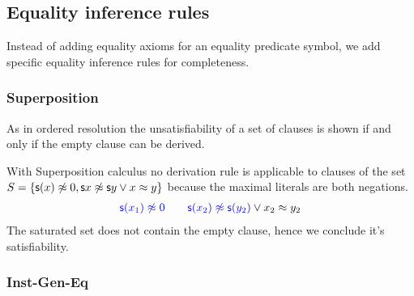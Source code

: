 
\subsection{Equality inference rules}

Instead of adding equality axioms for an equality predicate symbol,
we add specific equality inference rules for completeness.


\subsubsection{Superposition}\label{sec:superposition}

As in ordered resolution the unsatisfiability of a set of clauses is shown
if and only if the empty clause can be derived. 




\begin{example} With Superposition calculus no derivation rule is applicable
	to clauses of the set \( S = \{ \mathsf{s}(x)\not\approx 0, \mathsf{s}{x}\not\approx\mathsf{s}{y} \lor x\approx y \} \)
	because the maximal literals are both negations.
	\begin{align*}
	{\colN \msucc(x_1) \mNE 0}\qquad{\colN \msucc(x_2) \mNE \msucc(y_2)} \lor x_2\mEQ y_2
	\end{align*}
	The saturated set does not contain the empty clause, hence we conclude it's satisfiability.
\end{example}

\subsubsection{Inst-Gen-Eq}\label{sec:inst:gen:eq}

